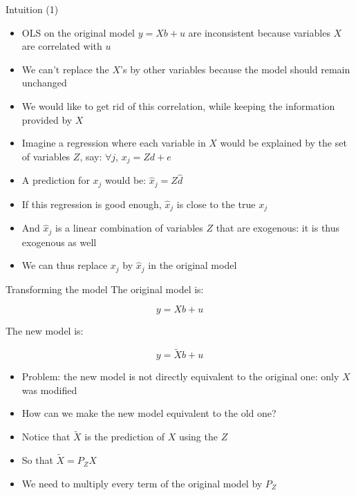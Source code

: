 \documentclass[aspectratio=169]{beamer}
\begin{document}
\begin{frame}{Intuition (1)}
\begin{itemize}
    \item OLS on the original model $y = Xb + u$ are inconsistent because variables $X$ are correlated with $u$
    \item We can't replace the $X$'s by other variables because the model should remain unchanged
    \item We would like to get rid of this correlation, while keeping the information provided by $X$
    \item Imagine a regression where each variable in $X$ would be explained by the set of variables $Z$, say: $\forall j$, $x_j = Zd + e$
    \item A prediction for $x_j$ would be: $\hat{x}_j = Z\hat{d}$
    \item If this regression is good enough, $\hat{x}_j$ is close to the true $x_j$
    \item And $\hat{x}_j$ is a linear combination of variables $Z$ that are exogenous: it is thus exogenous as well
    \item We can thus replace $x_j$ by $\hat{x}_j$ in the original model
\end{itemize}
\end{frame}

\begin{frame}{Transforming the model}
The original model is:

\[y = Xb + u\]

The new model is:

\[y = \tilde{X}b + u\]

\begin{itemize}
    \item Problem: the new model is not directly equivalent to the original one: only $X$ was modified
    \item How can we make the new model equivalent to the old one?
    \item Notice that $\tilde{X}$ is the prediction of $X$ using the $Z$
    \item So that $\tilde{X} = P_ZX$
    \item We need to multiply every term of the original model by $P_Z$
\end{itemize}
\end{frame}
\end{document}
